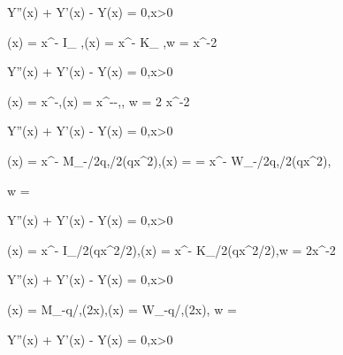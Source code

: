 \be
{} Y''(x) +  Y'(x) -  Y(x) = 0,\quad x>0
\ee

\be
\psi(x) = x^{-\nu} I_{} ,\quad\quad \varphi(x) = x^{-\nu} K_{} ,\quad\quad w = x^{-2}
\ee

\item 

\be
{} Y''(x) +  Y'(x) -  Y(x) = 0,\quad x>0
\ee

\be
\psi(x) = x^{-\nu},\quad\quad \varphi(x) = x^{--\nu},\quad\quad, w = 2 x^{-2}
\ee

\item 

\be
{} Y''(x) +  Y'(x) -  Y(x) = 0,\quad x>0
\ee

\be
\psi(x) = x^{-} M_{-\lm/2q,/2}(qx^2),\quad\quad \varphi(x) = = x^{-} W_{-\lm/2q,/2}(qx^2),
\ee

\be
w = 
\ee

\item 

\be
{} Y''(x) +  Y'(x) -  Y(x) = 0,\quad x>0
\ee

\be
\psi(x) = x^{-\nu} I_{/2}(qx^2/2),\quad\quad \varphi(x) = x^{-\nu} K_{/2}(qx^2/2),\quad\quad w = 2x^{-2}
\ee

\item 

\be
{} Y''(x) +  Y'(x) -  Y(x) = 0,\quad x>0
\ee

\be
\psi(x) =  M_{-q/\sqrt{2\lm},}(2x\sqrt{2\lm}),\quad\quad \varphi(x) =  W_{-q/\sqrt{2\lm},}(2x\sqrt{2\lm}),
\ee
\be
w = 
\ee

\item 

\be
{} Y''(x) +  Y'(x) -  Y(x) = 0,\quad x>0
\ee

